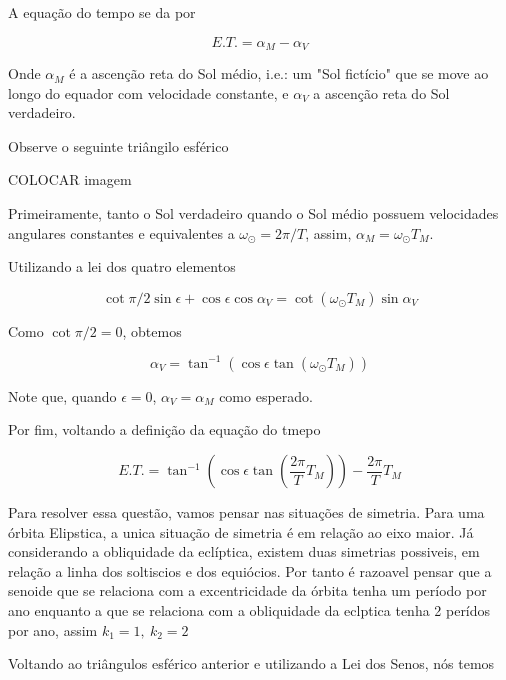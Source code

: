 \documentclass[11pt]{article}
\begin{document}
\begin{pproblem}
    \begin{pssolution*}{}{}
        \begin{alternativas}
            \item A equação do tempo se da por
            
            \[E.T. = \alpha_M - \alpha_V\]

            Onde \(\alpha_M\) é a ascenção reta do Sol médio, i.e.: um "Sol fictício" que se move ao longo do equador com velocidade constante, e \(\alpha_V\) a ascenção reta do Sol verdadeiro.

            Observe o seguinte triângilo esférico

            COLOCAR imagem

            Primeiramente, tanto o Sol verdadeiro quando o Sol médio possuem velocidades angulares constantes e equivalentes a \(\omega_\odot = 2\pi/T\), assim, \(\alpha_M=\omega_\odot T_M\).

            Utilizando a lei dos quatro elementos

            \[\cot \pi/2 \sin\epsilon + \cos\epsilon\cos\alpha_V=\cot(\omega_\odot T_M)\sin\alpha_V\]

            Como \(\cot\pi/2 =0\), obtemos

            \[\alpha_V = \tan^{-1}(\cos\epsilon\tan(\omega_\odot T_M))\]

            Note que, quando \(\epsilon = 0\), \(\alpha_V = \alpha_M\) como esperado.

            Por fim, voltando a definição da equação do tmepo

            \[\boxed{E.T. = \tan^{-1}\left(\cos\epsilon\tan\left(\frac{2\pi}{T} T_M\right)\right) - \frac{2\pi}{T}T_M}\]

            \item Para resolver essa questão, vamos pensar nas situações de simetria. Para uma órbita Elipstica, a unica situação de simetria é em relação ao eixo maior. Já considerando a obliquidade da eclíptica, existem duas simetrias possiveis, em relação a linha dos soltiscios e dos equiócios. Por tanto é razoavel pensar que a senoide que se relaciona com a excentricidade da órbita tenha um período por ano enquanto a que se relaciona com a obliquidade da eclptica tenha 2 perídos por ano, assim \(\boxed{k_1=1, \ k_2 = 2}\)
            
            \item Voltando ao triângulos esférico anterior e utilizando a Lei dos Senos, nós temos
            

\end{alternativas}
\end{pssolution*}
\end{pproblem}
\end{document}
